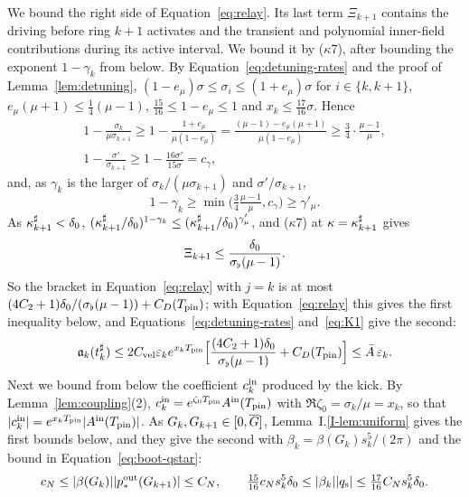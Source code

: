 We bound the right side of Equation~\eqref{eq:relay}. Its last term
$\Xi_{k+1}$ contains the driving before ring $k+1$ activates and the
transient and polynomial inner-field contributions during its active interval. We bound it by ($\kappa$7), after bounding the exponent
$1-\gamma_k$ from below. By
Equation~\eqref{eq:detuning-rates} and the proof of
Lemma~\ref{lem:detuning}, $(1-e_\mu)\sigma\le\sigma_i\le(1+e_\mu)\sigma$
for $i\in\{k,k+1\}$, $e_\mu(\mu+1)\le\frac14(\mu-1)$, $\frac{15}{16}\le1-e_\mu\le1$
and $x_k\le\frac{17}{16}\sigma$. Hence
\begin{gather*}
1-\frac{\sigma_k}{\mu\sigma_{k+1}}\ge1-\frac{1+e_\mu}{\mu(1-e_\mu)}
=\frac{(\mu-1)-e_\mu(\mu+1)}{\mu(1-e_\mu)}\ge\frac34\cdot\frac{\mu-1}\mu,\\
1-\frac{\sigma'}{\sigma_{k+1}}\ge1-\frac{16\sigma'}{15\sigma}=c_\gamma ,
\end{gather*}
and, as $\gamma_k$ is the larger of $\sigma_k/(\mu\sigma_{k+1})$ and
$\sigma'/\sigma_{k+1}$,
\begin{equation}
\label{eq:boot-remainder-exponent}
1-\gamma_k\ge\min\Big(\tfrac34\tfrac{\mu-1}\mu,c_\gamma\Big)\ge\gamma'_\mu.
\end{equation}
As $\kappa^\sharp_{k+1}<\delta_0$,
$(\kappa^\sharp_{k+1}/\delta_0)^{1-\gamma_k}\le(\kappa^\sharp_{k+1}/\delta_0)^{\gamma'_\mu}$, and
($\kappa$7) at $\kappa=\kappa^\sharp_{k+1}$ gives
\begin{equation}
\label{eq:boot-relay-remainder}
\Xi_{k+1}\le\frac{\delta_0}{\sigma_\flat(\mu-1)}.
\end{equation}
So
the bracket in Equation~\eqref{eq:relay} with $j=k$ is at most
$(4C_2+1)\delta_0/(\sigma_\flat(\mu-1))+C_D(T_{\mathrm{pin}})$; with Equation~\eqref{eq:relay}
this gives the first inequality below, and
Equations~\eqref{eq:detuning-rates} and~\eqref{eq:K1} give the second:
\begin{equation}
\label{eq:boot-quiet-activation}
\mathfrak{a}_k(t^\sharp_k)\le2C_{\mathrm{vel}} \varepsilon_ke^{x_kT_{\mathrm{pin}}}\Big[\frac{(4C_2+1)\delta_0}{\sigma_\flat(\mu-1)}+C_D(T_{\mathrm{pin}})\Big]\le\bar A\,\varepsilon_k .
\end{equation}
Next we bound from below the coefficient $c^{\mathrm{in}}_k$ produced by the kick. By
Lemma~\ref{lem:coupling}\textup{(2)}, $c^{\mathrm{in}}_k=e^{\zeta_0T_{\mathrm{pin}}}A^{\mathrm{in}}(T_{\mathrm{pin}})$ with
$\Re\zeta_0=\sigma_k/\mu=x_k$, so that $|c^{\mathrm{in}}_k|=e^{x_kT_{\mathrm{pin}}}|A^{\mathrm{in}}(T_{\mathrm{pin}})|$. As
$G_k,G_{k+1}\in[0,\overline{G}]$, Lemma~I.\ref{I-lem:uniform} gives the first bounds below,
and they give the second with $\beta_k=\beta(G_k)s_k^5/(2\pi)$ and the bound
in Equation~\eqref{eq:boot-qstar}:
\begin{equation}
\label{eq:boot-coupling-size}
c_N\le|\beta(G_k)||p^{\mathrm{out}}_*(G_{k+1})|\le C_N,\qquad
\tfrac{15}{16}c_Ns_k^5\delta_0\le|\beta_k||q_{\mathrm{s}}|\le\tfrac{17}{16}C_Ns_k^5\delta_0 .
\end{equation}
